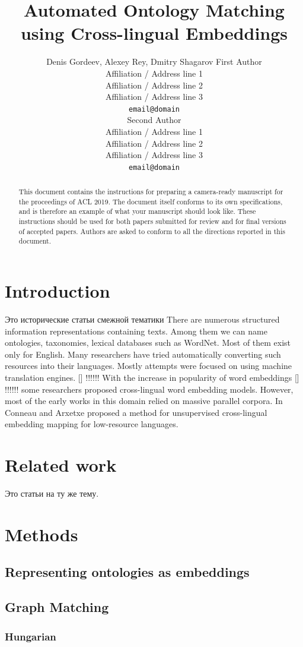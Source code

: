 \documentclass[11pt,a4paper]{article}
\title{Automated Ontology Matching using Cross-lingual Embeddings}
\author{Denis Gordeev, Alexey Rey, Dmitry Shagarov
	First Author \\
  Affiliation / Address line 1 \\
  Affiliation / Address line 2 \\
  Affiliation / Address line 3 \\
  \texttt{email@domain} \\\And
  Second Author \\
  Affiliation / Address line 1 \\
  Affiliation / Address line 2 \\
  Affiliation / Address line 3 \\
  \texttt{email@domain} \\}
\date{}
\begin{document}
\maketitle
\begin{abstract}
  This document contains the instructions for preparing a camera-ready
  manuscript for the proceedings of ACL 2019. The document itself
  conforms to its own specifications, and is therefore an example of
  what your manuscript should look like. These instructions should be
  used for both papers submitted for review and for final versions of
  accepted papers.  Authors are asked to conform to all the directions
  reported in this document.
\end{abstract}


\section{Introduction}
\foreignlanguage{russian}{Это исторические статьи смежной тематики}
There are numerous structured information representations containing texts. Among them we can name ontologies, taxonomies, lexical databases such as WordNet. Most of them exist only for English. Many researchers have tried automatically converting such resources into their languages. Mostly attempts were focused on using machine translation engines. [] !!!!!! With the increase in popularity of word embeddings [] !!!!!! some researchers proposed cross-lingual word embedding models. However, most of the early works in this domain relied on massive parallel corpora. In \citeyearpar{muse} Conneau and Arxetxe proposed a method for unsupervised cross-lingual embedding mapping for low-resource languages.

\section{Related work}
\foreignlanguage{russian}{Это статьи на ту же тему.}
\section{Methods}
\subsection{Representing ontologies as embeddings}
\subsection{Graph Matching}
\subsubsection{Hungarian}
\end{document}
